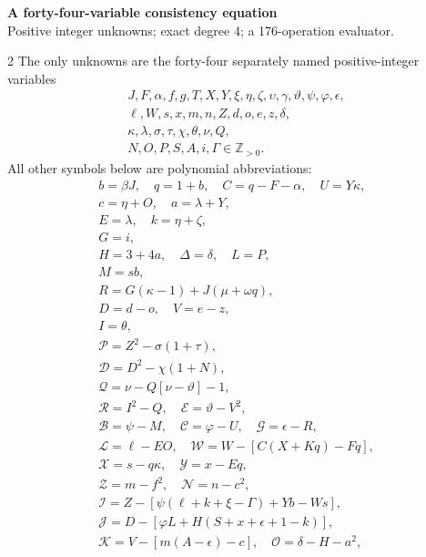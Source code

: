 \documentclass[10pt]{article}
\begin{document}
\begin{center}
{\large\bfseries A forty-four-variable consistency equation}\\[-1pt]
{\small Positive integer unknowns; exact degree 4; a 176-operation evaluator.}
\end{center}\vspace{-8pt}
\begin{multicols}{2}
\fontsize{8.6}{9.1}\selectfont
The only unknowns are the forty-four separately named positive-integer variables
\[
\begin{gathered}J,F,\alpha,f,g,T,X,Y,\xi,\eta,\zeta,\upsilon,\gamma,\vartheta,\psi,\varphi,\epsilon,\\
\ell,W,s,x,m,n,Z,d,o,e,z,\delta,\\
\kappa,\lambda,\sigma,\tau,\chi,\theta,\nu,Q,\\
N,O,P,S,A,i,\Gamma\in\mathbb Z_{>0}.\end{gathered}
\]
All other symbols below are polynomial abbreviations:
\[
\begin{gathered}
b=\beta J,\quad q=1+b,\quad C=q-F-\alpha,\quad U=Y\kappa,\\
c=\eta+O,\quad a=\lambda+Y,\\
E=\lambda,\quad k=\eta+\zeta,\\
G=i,\\
H=3+4a,\quad\Delta=\delta,\quad L=P,\\
M=sb,\\
R=G(\kappa-1)+J(\mu+\omega q),\\
D=d-o,\quad V=e-z,\\
I=\theta,\\
\mathcal{P}=Z^2-\sigma(1+\tau),\\
\mathcal{D}=D^2-\chi(1+N),\\
\mathcal{Q}=\nu-Q[\nu-\vartheta]-1,\\
\mathcal{R}=I^2-Q,\quad \mathcal{E}=\vartheta-V^2,\\
\mathcal{B}=\psi-M,\quad \mathcal{C}=\varphi-U,\quad \mathcal{G}=\epsilon-R,\\
\mathcal{L}=\ell-EO,\quad \mathcal{W}=W-[C(X+Kq)-Fq],\\
\mathcal{X}=s-q\kappa,\quad \mathcal{Y}=x-Eq,\\
\mathcal{Z}=m-f^2,\quad \mathcal{N}=n-c^2,\\
\mathcal{I}=Z-[\psi(\ell+k+\xi-\Gamma)+Yb-Ws],\\
\mathcal{J}=D-[\varphi L+H(S+x+\epsilon+1-k)],\\
\mathcal{K}=V-[m(A-\epsilon)-c],\quad\mathcal{O}=\delta-H-a^2,\\

\end{gathered}\]
\end{multicols}
\end{document}
